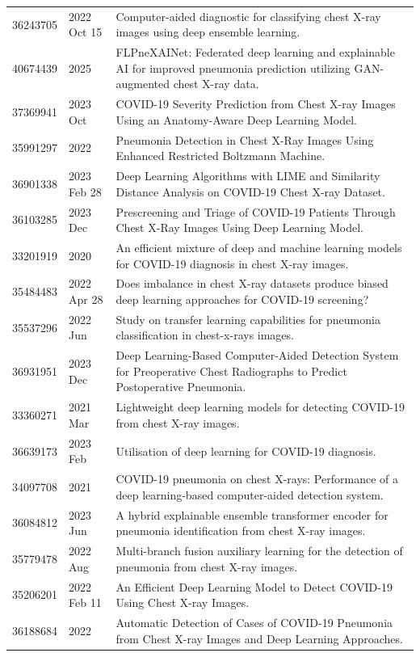 \begin{longtable}{llp{9.5cm}}
36243705 & 2022 Oct 15 & Computer-aided diagnostic for classifying chest X-ray images using deep ensemble learning. \\
40674439 & 2025 & FLPneXAINet: Federated deep learning and explainable AI for improved pneumonia prediction utilizing GAN-augmented chest X-ray data. \\
37369941 & 2023 Oct & COVID-19 Severity Prediction from Chest X-ray Images Using an Anatomy-Aware Deep Learning Model. \\
35991297 & 2022 & Pneumonia Detection in Chest X-Ray Images Using Enhanced Restricted Boltzmann Machine. \\
36901338 & 2023 Feb 28 & Deep Learning Algorithms with LIME and Similarity Distance Analysis on COVID-19 Chest X-ray Dataset. \\
36103285 & 2023 Dec & Prescreening and Triage of COVID-19 Patients Through Chest X-Ray Images Using Deep Learning Model. \\
33201919 & 2020 & An efficient mixture of deep and machine learning models for COVID-19 diagnosis in chest X-ray images. \\
35484483 & 2022 Apr 28 & Does imbalance in chest X-ray datasets produce biased deep learning approaches for COVID-19 screening? \\
35537296 & 2022 Jun & Study on transfer learning capabilities for pneumonia classification in chest-x-rays images. \\
36931951 & 2023 Dec & Deep Learning-Based Computer-Aided Detection System for Preoperative Chest Radiographs to Predict Postoperative Pneumonia. \\
33360271 & 2021 Mar & Lightweight deep learning models for detecting COVID-19 from chest X-ray images. \\
36639173 & 2023 Feb & Utilisation of deep learning for COVID-19 diagnosis. \\
34097708 & 2021 & COVID-19 pneumonia on chest X-rays: Performance of a deep learning-based computer-aided detection system. \\
36084812 & 2023 Jun & A hybrid explainable ensemble transformer encoder for pneumonia identification from chest X-ray images. \\
35779478 & 2022 Aug & Multi-branch fusion auxiliary learning for the detection of pneumonia from chest X-ray images. \\
35206201 & 2022 Feb 11 & An Efficient Deep Learning Model to Detect COVID-19 Using Chest X-ray Images. \\
36188684 & 2022 & Automatic Detection of Cases of COVID-19 Pneumonia from Chest X-ray Images and Deep Learning Approaches. \\

\end{longtable}
